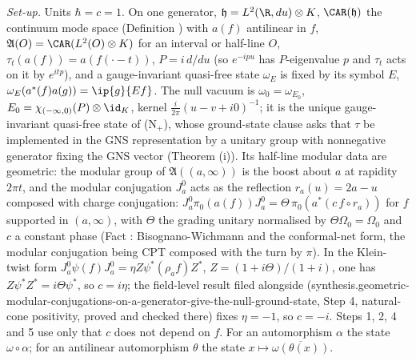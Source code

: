 \emph{Set-up.} Units $\hbar = c = 1$. On one generator, $\mathfrak{h} = L^{2}(\R, du)\otimes K$, $\CAR(\mathfrak{h})$ the continuum mode space (Definition ) with $a(f)$ antilinear in $f$, $\mathfrak{A}(O) = \CAR(L^{2}(O)\otimes K)$ for an interval or half-line $O$, $\tau_{t}(a(f)) = a(f(\cdot - t))$, $P = i\,d/du$ (so $e^{-ipu}$ has $P$-eigenvalue $p$ and $\tau_{t}$ acts on it by $e^{itp}$), and a gauge-invariant quasi-free state $\omega_{E}$ is fixed by its symbol $E$, $\omega_{E}(a^{*}(f)a(g)) = \ip{g}{Ef}$. The null vacuum is $\omega_{0} = \omega_{E_{0}}$, $E_{0} = \chi_{(-\infty,0)}(P)\otimes\id_{K}$, kernel $\tfrac{i}{2\pi}(u - v + i0)^{-1}$; it is the unique gauge-invariant quasi-free state of (N$_{+}$), whose ground-state clause asks that $\tau$ be implemented in the GNS representation by a unitary group with nonnegative generator fixing the GNS vector (Theorem (i)). Its half-line modular data are geometric: the modular group of $\mathfrak{A}((a, \infty))$ is the boost about $a$ at rapidity $2\pi t$, and the modular conjugation $J^{0}_{a}$ acts as the reflection $r_{a}(u) = 2a - u$ composed with charge conjugation: $J^{0}_{a}\pi_{0}(a(f))J^{0}_{a} = \Theta\,\pi_{0}(a^{*}(c\,f\circ r_{a}))$ for $f$ supported in $(a, \infty)$, with $\Theta$ the grading unitary normalised by $\Theta\Omega_{0} = \Omega_{0}$ and $c$ a constant phase (Fact : Bisognano-Wichmann and the conformal-net form, the modular conjugation being CPT composed with the turn by $\pi$). In the Klein-twist form $J^{0}_{a}\psi(f)J^{0}_{a} = \eta Z\psi^{*}(\rho_{a}f)Z^{*}$, $Z = (1 + i\Theta)/(1 + i)$, one has $Z\psi^{*}Z^{*} = i\Theta\psi^{*}$, so $c = i\eta$; the field-level result filed alongside (synthesis.geometric-modular-conjugations-on-a-generator-give-the-null-ground-state, Step 4, natural-cone positivity, proved and checked there) fixes $\eta = -1$, so $c = -i$. Steps 1, 2, 4 and 5 use only that $c$ does not depend on $f$. For an automorphism $\alpha$ the state $\omega\circ\alpha$; for an antilinear automorphism $\theta$ the state $x \mapsto \overline{\omega(\theta(x))}$.

